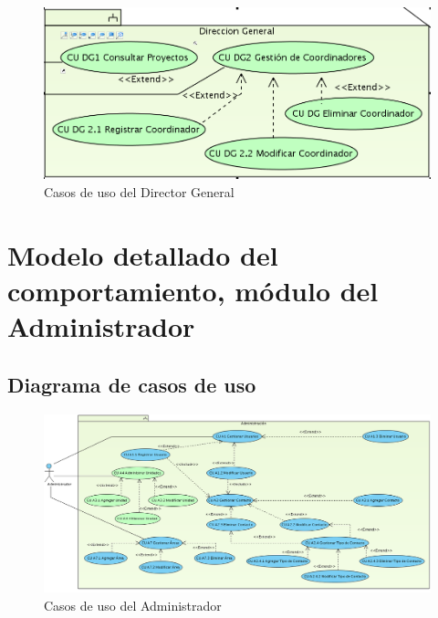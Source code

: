 \documentclass[10pt]{book}
\begin{document}
\begin{figure}[htbp!]
	\begin{center}
		\includegraphics[width=\textwidth]{images/CU-DG}
		\caption{Casos de uso del Director General}
		\label{fig:default}
	\end{center}
\end{figure}


\chapter{Modelo detallado del comportamiento, módulo del Administrador} 

\section{Diagrama de casos de uso}

\begin{figure}[htbp!]
	\begin{center}
		\includegraphics[width=\textwidth]{images/CUadministrador}
		\caption{Casos de uso del Administrador}
		\label{fig:default}
	\end{center}
\end{figure}
\end{document}
